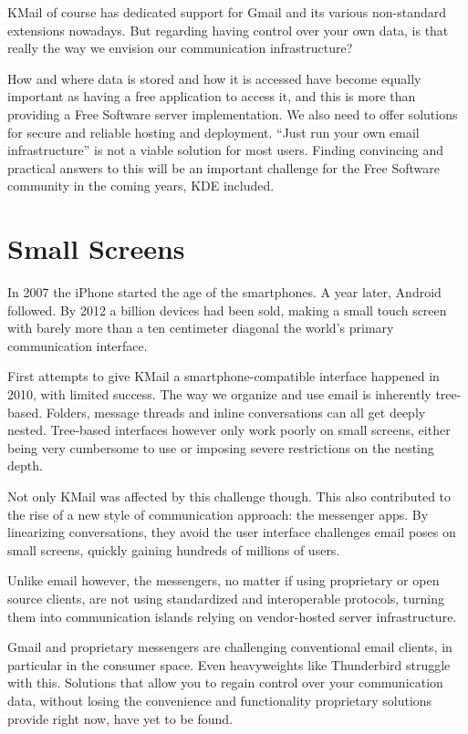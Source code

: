 KMail of course has dedicated support for Gmail and its various non-standard extensions nowadays. But regarding having control over your own data, is that really the way we envision our communication infrastructure?

How and where data is stored and how it is accessed have become equally important as having a free application to access it, and this is more than providing a Free Software server implementation. We also need to offer solutions for secure and reliable hosting and deployment. “Just run your own email infrastructure” is not a viable solution for most users. Finding convincing and practical answers to this will be an important challenge for the Free Software community in the coming years, KDE included.

\section*{Small Screens}

In 2007 the iPhone started the age of the smartphones. A year later, Android followed. By 2012 a billion devices had been sold, making a small touch screen with barely more than a ten centimeter diagonal the world's primary communication interface.

First attempts to give KMail a smartphone-compatible interface happened in 2010, with limited success. The way we organize and use email is inherently tree-based. Folders, message threads and inline conversations can all get deeply nested. Tree-based interfaces however only work poorly on small screens, either being very cumbersome to use or imposing severe restrictions on the nesting depth.

Not only KMail was affected by this challenge though. This also contributed to the rise of a new style of communication approach: the messenger apps. By linearizing conversations, they avoid the user interface challenges email poses on small screens, quickly gaining hundreds of millions of users.

Unlike email however, the messengers, no matter if using proprietary or open source clients, are not using standardized and interoperable protocols, turning them into communication islands relying on vendor-hosted server infrastructure.

Gmail and proprietary messengers are challenging conventional email clients, in particular in the consumer space. Even heavyweights like Thunderbird struggle with this. Solutions that allow you to regain control over your communication data, without losing the convenience and functionality proprietary solutions provide right now, have yet to be found.

